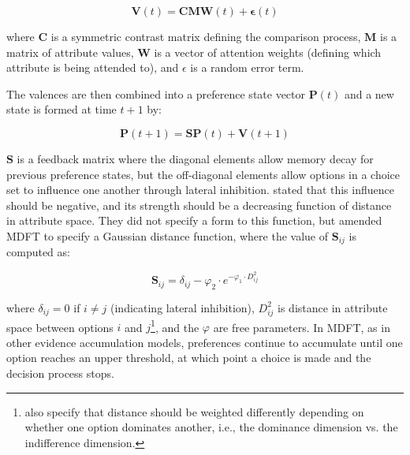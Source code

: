
\begin{equation}
    \boldsymbol{V}(t)=\boldsymbol{C}\bm{M}\boldsymbol{W}(t) + \boldsymbol{\epsilon}(t)
    \label{eqn:mdft}
\end{equation}

where $\boldsymbol{C}$ is a symmetric contrast matrix defining the comparison process, $\boldsymbol{M}$ is a matrix of attribute values, $\boldsymbol{W}$ is a vector of attention weights (defining which attribute is being attended to), and $\epsilon$ is a random error term. 

The valences are then combined into a preference state vector $\boldsymbol{P}(t)$ and a new state is formed at time $t+1$ by:

\begin{equation}
    \boldsymbol{P}(t+1)=\boldsymbol{SP}(t)+\boldsymbol{V}(t+1)
    \label{eqn:mdft1}
\end{equation}

$\boldsymbol{S}$ is a feedback matrix where the diagonal elements allow memory decay for previous preference states, but the off-diagonal elements allow options in a choice set to influence one another through lateral inhibition. \textcite{roeMultialternativeDecisionField2001a} stated that this influence should be negative, and its strength should be a decreasing function of distance in attribute space. They did not specify a form to this function, but \textcite{hotalingTheoreticalDevelopmentsDecision2010} amended MDFT to specify a Gaussian distance function, where the value of $\boldsymbol{S}_{ij}$ is computed as:

\begin{equation}
    \boldsymbol{S}_{ij}=\delta_{ij}-\varphi_{2} \cdot e^{-\varphi_{1} \cdot D^2_{ij}}
    \label{eqn:mdft2}
\end{equation}

where $\delta_{ij}=0$ if $i\neq j$ (indicating lateral inhibition), $D^2_{ij}$ is distance in attribute space between options $i$ and $j$\footnote{\textcite{hotalingTheoreticalDevelopmentsDecision2010} also specify that distance should be weighted differently depending on whether one option dominates another, i.e., the dominance dimension vs. the indifference dimension.}, and the $\varphi$ are free parameters. In MDFT, as in other evidence accumulation models, preferences continue to accumulate until one option reaches an upper threshold, at which point a choice is made and the decision process stops.

